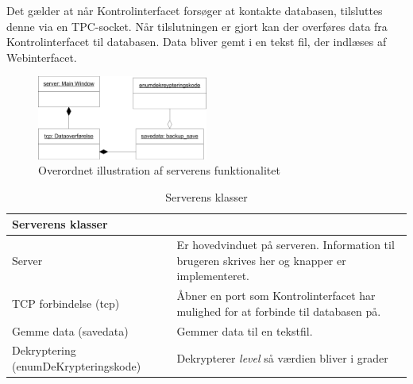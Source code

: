 Det gælder at når Kontrolinterfacet forsøger at kontakte databasen, tilsluttes denne via en TPC-socket. Når tilslutningen er gjort kan der overføres data fra Kontrolinterfacet til databasen. Data bliver gemt i en tekst fil, der indlæses af Webinterfacet.
\begin{figure}[H]
\centering
\includegraphics[width = 0.5\textwidth]{billeder/database_server}
\caption{Overordnet illustration af serverens funktionalitet}
\label{fig:database_server}
\end{figure}

\begin{table}[H]
\centering
{}
\begin{tabular}{| p{3cm}  p{12cm}|}
\multicolumn{2}{l}{{\Large Serverens klasser}} \\\hline

Server & Er hovedvinduet på serveren. Information til brugeren skrives her og knapper er implementeret. \\\hline
TCP forbindelse (tcp) & Åbner en port som Kontrolinterfacet har mulighed for at forbinde til databasen på.\\\hline
Gemme data (savedata) & Gemmer data til en tekstfil.\\\hline
Dekryptering (enumDeKrypteringskode) & Dekrypterer \textit{level} så værdien bliver i grader\\\hline
\end{tabular}
\caption{Serverens klasser}
\label{tabel:server-klasser}
\end{table}

